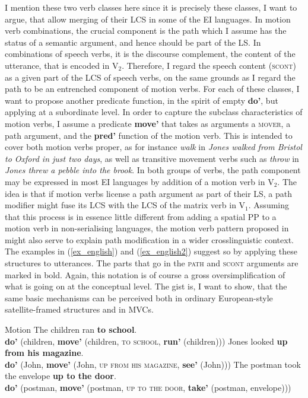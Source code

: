 I mention these two verb classes here since it is precisely these classes, I want to argue, that allow merging of their LCS in some of the EI languages. In motion verb combinations, the crucial component is the path which I assume has the status of a semantic argument, and hence should be part of the LS. In combinations of speech verbs, it is the discourse complement, the content of the utterance, that is encoded in V$_2$. Therefore, I regard the speech content (\textsc{scont}) as a given part of the LCS of speech verbs, on the same grounds as I regard the path to be an entrenched component of motion verbs. For each of these classes, I want to propose another predicate function, in the spirit of empty \textbf{do'}, but applying at a subordinate level. In order to capture the subclass characteristics of motion verbs, I assume a predicate \textbf{move'} that takes as arguments a \textsc{mover}, a path argument, and the \textbf{pred'} function of the motion verb. This is intended to cover both motion verbs proper, as for instance \textit{walk} in \textit{Jones walked from Bristol to Oxford in just two days}, as well as transitive movement verbs such as \textit{throw} in \textit{Jones threw a pebble into the brook}. In both groups of verbs, the path component may be expressed in most EI languages by addition of a motion verb in V$_2$. The idea is that if motion verbs license a path argument as part of their LS, a path modifier might fuse its LCS with the LCS of the matrix verb in V$_1$. Assuming that this process is in essence little different from adding a spatial PP to a motion verb in non-serialising languages, the motion verb pattern proposed in  might also serve to explain path modification in a wider crosslinguistic context. The examples in (\ref{ex_english}) and (\ref{ex_english2}) suggest so by applying these structures to  utterances. The parts that go in the \textsc{path} and \textsc{scont} arguments are marked in bold. Again, this notation is of course a gross oversimplification of what is going on at the conceptual level. The gist is, I want to show, that the same basic mechanisms can be perceived both in ordinary European-style satellite-framed structures and in MVCs.

\ea Motion \label{ex_english}
\ea The children ran \textbf{to school}. \\
\textbf{do'} (children, \textbf{move'} (children, \textsc{to school}, \textbf{run'} (children)))
\ex Jones looked \textbf{up from his magazine}. \\
\textbf{do'} (John, \textbf{move'} (John, \textsc{up from his magazine}, \textbf{see'} (John)))
\ex The postman took the envelope \textbf{up to the door}. \\
\textbf{do'} (postman, \textbf{move'} (postman, \textsc{up to the door}, \textbf{take'} (postman, envelope)))
\z
\z

